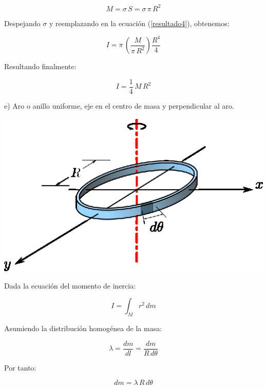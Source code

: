 \documentclass[letter,11pt]{article}
\begin{document}
\begin{equation*}
    M = \sigma\, S = \sigma\, \pi\, R^2
\end{equation*}

Despejando $\sigma$ y reemplazando en la ecuación (\ref{resultado4}), obtenemos:

\begin{equation*}
    I = \pi\, \left( \frac{M}{\pi\, R^2} \right) \frac{R^4}{4}
\end{equation*}

Resultando finalmente:

\begin{equation}
    I = \frac{1}{4}\, M\, R^2
\end{equation}

\newpage
e) Aro o anillo uniforme, eje en el centro de masa y perpendicular al aro.

\begin{center}
\includegraphics[scale=1.75]{resources/f5.eps}
\end{center}

Dada la ecuación del momento de inercia:

\begin{equation}
    I = \int_{M} r^2\, dm
\label{momentodeinercia5}
\end{equation}

Asumiendo la distribución homogénea de la masa:

\begin{equation*}
    \lambda = \frac{dm}{dl} = \frac{dm}{R\, d\theta}
\end{equation*}

Por tanto:

\begin{equation}
    dm = \lambda\, R\, d\theta
\label{dm5}
\end{equation}
\end{document}
